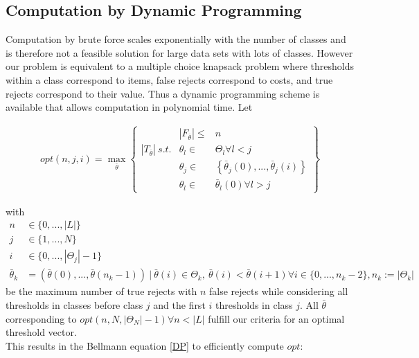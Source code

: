 \subsection{Computation by Dynamic Programming}
\label{dp}
Computation by brute force scales exponentially with the number of classes and is therefore not a feasible solution for large data sets with lots of classes. However our problem is equivalent to a multiple choice knapsack problem \cite{Sin:1979} where thresholds within a class correspond to items, false rejects correspond to costs, and true rejects correspond to their value. Thus a dynamic programming scheme is available that allows computation in polynomial time.
Let


\begin{align}
opt(n,j,i) = \max_{\bar{\theta}}
\begin{Bmatrix}
	 & \left|F_{\bar{\theta}}\right| \leq  & n \\
  	\left|T_{\bar{\theta}}\right| \ s.t. & \theta_l \in & \Theta_l \forall l < j \\
  	 & \theta_j \in & \left\{\bar{\theta}_j(0),...,\bar{\theta}_j(i)\right\} \\
  	 & \theta_l \in & \bar{\theta}_l(0) \forall l > j
\end{Bmatrix}
\end{align}

with 
\begin{align}
	n &\in \{0,...,|L|\} \\
	j &\in \{1,...,N\} \\
	i &\in \{0,...,\left|\Theta_j\right|-1\} \\
	\bar{\theta}_k &= (\bar{\theta}(0),...,\bar{\theta}(n_k-1)) \ | \ \bar{\theta}(i) \in \Theta_k, \ \bar{\theta}(i) < \bar{\theta}(i+1) \forall i \in \{0,...,n_k-2\}, n_k:=\left|\Theta_k\right|
\end{align}
be the maximum number of true rejects with $n$ false rejects while considering all thresholds in classes before class $j$ and the first $i$ thresholds in class $j$. All $\bar{\theta}$ corresponding to $opt(n,N,\left|\Theta_N\right|-1) \forall n<\left|L\right|$ fulfill our criteria for an optimal threshold vector. \\
This results in the Bellmann equation \ref{DP} \cite{Bel:1957} to efficiently compute $opt$:

